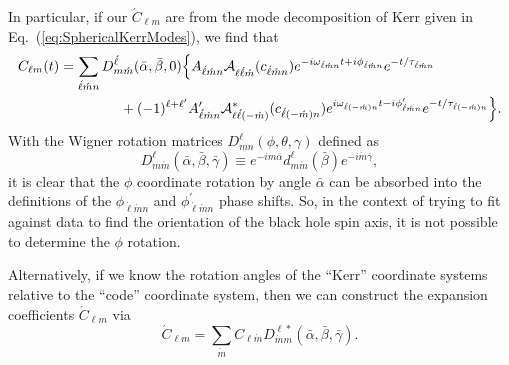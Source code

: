 \documentclass[11pt]{article}
\newcommand{\YSH}[3][]{\mathcal{A}^{#1}_{#2}(#3)}
\begin{document}
In particular, if our $\acute{C}_{\ell m}$ are from the mode decomposition
of Kerr given in Eq.~(\ref{eq:SphericalKerrModes}), we find that
\begin{equation}\label{eq:SphericalRotatedKerrModes}
\begin{aligned}
 C_{\ell{m}}(t) & = \sum_{\acute\ell\acute{m}n}
 D^{\acute\ell}_{m\acute{m}}(\bar\alpha,\bar\beta,0) \Big\{ 
   A_{\acute\ell\acute{m}n}\YSH{\ell\acute\ell\acute{m}}{c_{\acute\ell\acute{m}n}}
    e^{-i\omega_{\acute\ell\acute{m}n}t+i\phi_{\acute\ell\acute{m}n}}e^{-t/\tau_{\acute\ell\acute{m}n}} \\
& {} \hspace{0.6in}
  + (-1)^{\ell+\ell^\prime} A^\prime_{\acute\ell\acute{m}n}
    \YSH[*]{\ell\acute\ell(-\acute{m})}{c_{\acute\ell(-\acute{m})n}}
    e^{i\omega_{\acute\ell(-\acute{m})n}t-i\phi^\prime_{\acute\ell\acute{m}n}}e^{-t/\tau_{\acute\ell(-\acute{m})n}} \Big\}.
\end{aligned}
\end{equation}
With the Wigner rotation matrices $D^\ell_{mn}(\phi,\theta,\gamma)$
defined as
\begin{equation}
  D^\ell_{m\acute{m}}(\bar\alpha,\bar\beta,\bar\gamma) \equiv 
       e^{-im\bar\alpha} d^\ell_{m\acute{m}}(\bar\beta) e^{-i\acute{m}\bar\gamma},
\end{equation}
it is clear that the $\phi$ coordinate rotation by angle $\bar\alpha$
can be absorbed into the definitions of the
$\phi_{\acute\ell\acute{m}n}$ and $\phi^\prime_{\acute\ell\acute{m}n}$
phase shifts.  So, in the context of trying to fit against data to
find the orientation of the black hole spin axis, it is not possible
to determine the $\phi$ rotation.

Alternatively, if we know the rotation angles of the ``Kerr''
coordinate systems relative to the ``code'' coordinate system, then
we can construct the expansion coefficients $\acute{C}_{\ell{m}}$ via
\begin{equation}
  \acute{C}_{\ell{m}} = \sum_{\acute{m}}{C_{\ell\acute{m}}
                      D^{\ell{*}}_{\acute{m}m}(\bar\alpha,\bar\beta,\bar\gamma)}.
\end{equation}


\newpage
{}
\vspace{0.25in}
\end{document}
